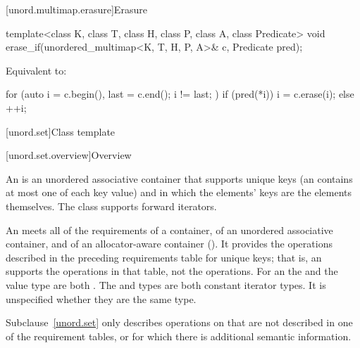 [unord.multimap.erasure]{Erasure}

%
\begin{itemdecl}
template<class K, class T, class H, class P, class A, class Predicate>
  void erase_if(unordered_multimap<K, T, H, P, A>& c, Predicate pred);
\end{itemdecl}

\begin{itemdescr}
\pnum
\effects
Equivalent to:
\begin{codeblock}
for (auto i = c.begin(), last = c.end(); i != last; ) {
  if (pred(*i)) {
    i = c.erase(i);
  } else {
    ++i;
  }
}
\end{codeblock}
\end{itemdescr}

[unord.set]{Class template }%

[unord.set.overview]{Overview}

\pnum
{}%
%
An  is an unordered associative container that
supports unique keys (an  contains at most one of each
key value) and in which the elements' keys are the elements
themselves.
The  class
supports forward iterators.

\pnum
An  meets all of the requirements of a container, of an unordered associative container, and of an allocator-aware container (). It provides the operations described in the preceding requirements table for unique keys; that is, an  supports the  operations in that table, not the  operations. For an  the  and the value type are both . The  and  types are both constant iterator types. It is unspecified whether they are the same type.

\pnum
Subclause~\ref{unord.set} only describes operations on  that
are not described in one of the requirement tables, or for which there
is additional semantic information.

